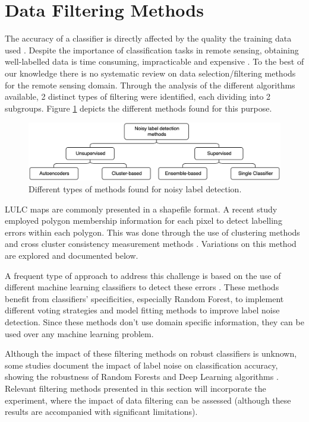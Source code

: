 \documentclass[12pt, english, openany]{book}
\begin{document}
\section{Data Filtering Methods}

The accuracy of a classifier is directly affected by the quality the training
data used \cite{Boukir2019}. Despite the importance of classification
tasks in remote sensing, obtaining well-labelled data is time consuming,
impracticable and expensive \cite{Pelletier2017Filtering}. To the best of our
knowledge there is no systematic review on data selection/filtering methods for
the remote sensing domain. Through the analysis of the different algorithms
available, 2 distinct types of filtering were identified, each dividing into 2
subgroups. Figure \ref{fig:noisy-label-detection} depicts the different methods found
for this purpose.

\begin{figure}[H]
  \centering
  \includegraphics[width=1\linewidth]{noisy_label_detection.png}
  \caption{Different types of methods found for noisy label detection.}
  \label{fig:noisy-label-detection}
\end{figure}

LULC maps are commonly presented in a shapefile format. A recent study employed
polygon membership information for each pixel to detect labelling errors within
each polygon. This was done through the use of clustering methods and cross
cluster consistency measurement methods \cite{Paris2019}. Variations on
this method are explored and documented below.

A frequent type of approach to address this challenge is based on the use of
different machine learning classifiers to detect these errors
\cite{Brodley1999, Jiang2004, Liu2008, Yuan2018, Zhang2018, Pelletier2017Filtering,
  Garcia-Gil2019, Boukir2019, Zhang2019}. These methods benefit from classifiers' specificities,
especially Random Forest, to implement different voting strategies and model
fitting methods to improve label noise detection. Since these methods don't use
domain specific information, they can be used over any machine learning
problem.

Although the impact of these filtering methods on robust classifiers is
unknown, some studies document the impact of label noise on classification
accuracy, showing the robustness of Random Forests and Deep Learning algorithms
\cite{Pelletier2017Effect, Rolnick2017}. Relevant filtering methods presented in this section
will incorporate the experiment, where the impact of data filtering can be
assessed (although these results are accompanied with significant limitations).
\end{document}
